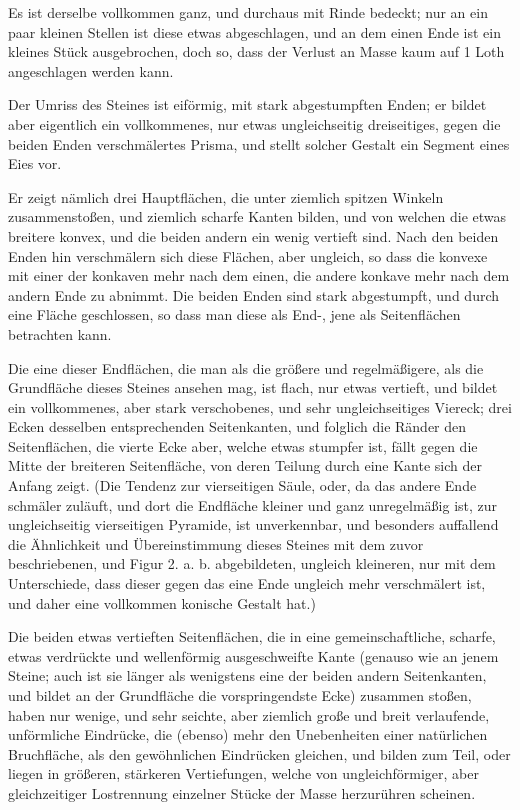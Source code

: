 \documentclass[a4paper, 11pt, oneside, german]{article}
\begin{document}
Es ist derselbe vollkommen ganz, und durchaus mit Rinde bedeckt; nur an ein paar kleinen Stellen ist diese etwas abgeschlagen, und an dem einen Ende ist ein kleines Stück ausgebrochen, doch so, dass der Verlust an Masse kaum auf 1 Loth angeschlagen werden kann.

Der Umriss des Steines ist eiförmig, mit stark abgestumpften Enden; er bildet aber eigentlich ein vollkommenes, nur etwas ungleichseitig dreiseitiges, gegen die beiden Enden verschmälertes Prisma, und stellt solcher Gestalt ein Segment eines Eies vor.

Er zeigt nämlich drei Hauptflächen, die unter ziemlich spitzen Winkeln zusammenstoßen, und ziemlich scharfe Kanten bilden, und von welchen die etwas breitere konvex, und die beiden andern ein wenig vertieft sind. Nach den beiden Enden hin verschmälern sich diese Flächen, aber ungleich, so dass die konvexe mit einer der konkaven mehr nach dem einen, die andere konkave mehr nach dem andern Ende zu abnimmt. Die beiden Enden sind stark abgestumpft, und durch eine Fläche geschlossen, so dass man diese als End-, jene als Seitenflächen betrachten kann.

Die eine dieser Endflächen, die man als die größere und regelmäßigere, als die Grundfläche dieses Steines ansehen mag, ist flach, nur etwas vertieft, und bildet ein vollkommenes, aber stark verschobenes, und sehr ungleichseitiges Viereck; drei Ecken desselben entsprechenden Seitenkanten, und folglich die Ränder den Seitenflächen, die vierte Ecke aber, welche etwas stumpfer ist, fällt gegen die Mitte der breiteren Seitenfläche, von deren Teilung durch eine Kante sich der Anfang zeigt. (Die Tendenz zur vierseitigen Säule, oder, da das andere Ende schmäler zuläuft, und dort die Endfläche kleiner und ganz unregelmäßig ist, zur ungleichseitig vierseitigen Pyramide, ist unverkennbar, und besonders auffallend die Ähnlichkeit und Übereinstimmung dieses Steines mit dem zuvor beschriebenen, und Figur 2. a. b. abgebildeten, ungleich kleineren, nur mit dem Unterschiede, dass dieser gegen das eine Ende ungleich mehr verschmälert ist, und daher eine vollkommen konische Gestalt hat.)

Die beiden etwas vertieften Seitenflächen, die in eine gemeinschaftliche, scharfe, etwas verdrückte und wellenförmig ausgeschweifte Kante (genauso wie an jenem Steine; auch ist sie länger als wenigstens eine der beiden andern Seitenkanten, und bildet an der Grundfläche die vorspringendste Ecke) zusammen stoßen, haben nur wenige, und sehr seichte, aber ziemlich große und breit verlaufende, unförmliche Eindrücke, die (ebenso) mehr den Unebenheiten einer natürlichen Bruchfläche, als den gewöhnlichen Eindrücken gleichen, und bilden zum Teil, oder liegen in größeren, stärkeren Vertiefungen, welche von ungleichförmiger, aber gleichzeitiger Lostrennung einzelner Stücke der Masse herzurühren scheinen.
\end{document}
